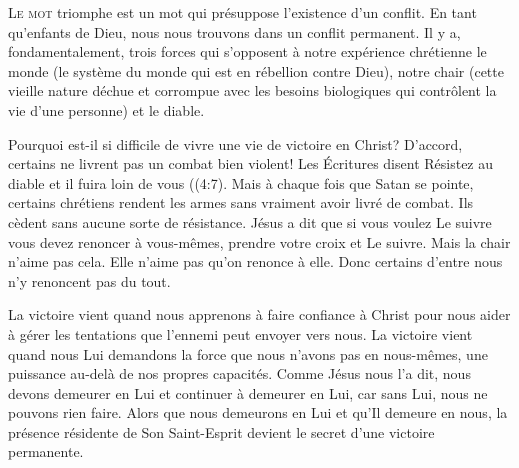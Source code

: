 \lettrine{L}{e mot} \Og triomphe \Fg{}
 est un mot qui présuppose l'existence d'un conflit.
 En tant qu'enfants de Dieu,
 nous nous trouvons dans un conflit permanent.
 Il y a, fondamentalement, trois forces qui s'opposent
 à notre expérience chrétienne\frcolon{} le monde
 (le système du monde qui est en rébellion contre Dieu),
 notre chair (cette vieille nature déchue et corrompue
 avec les besoins biologiques qui contrôlent
 la vie d'une personne) et le diable.


Pourquoi est-il si difficile de vivre une vie de victoire en Christ?
 D'accord, certains ne livrent pas un combat bien violent!
 Les Écritures disent\frcolon{} 
 \Og Résistez au diable et il fuira loin de vous \Fg{}
 ((4:7).
 Mais à chaque fois que Satan se pointe, certains chrétiens rendent
 les armes sans vraiment avoir livré de combat.
 Ils cèdent sans aucune sorte de résistance.
 Jésus a dit que si vous voulez Le suivre vous devez renoncer à vous-mêmes,
 prendre votre croix et Le suivre.
 Mais la chair n'aime pas cela. Elle n'aime pas qu'on renonce à elle.
 Donc certains d'entre nous n'y renoncent pas du tout.

La victoire vient quand nous apprenons à faire confiance à Christ
 pour nous aider à gérer les tentations que l'ennemi peut envoyer vers nous.
 La victoire vient quand nous Lui demandons la force
 que nous n'avons pas en nous-mêmes, une puissance au-delà
 de nos propres capacités.
 Comme Jésus nous l'a dit, nous devons demeurer en Lui
 et continuer à demeurer en Lui, car sans Lui, nous ne pouvons rien faire.
 Alors que nous demeurons en Lui et qu'Il demeure en nous,
 la présence résidente de Son Saint-Esprit
 devient le secret d'une victoire permanente.

\dvrule





